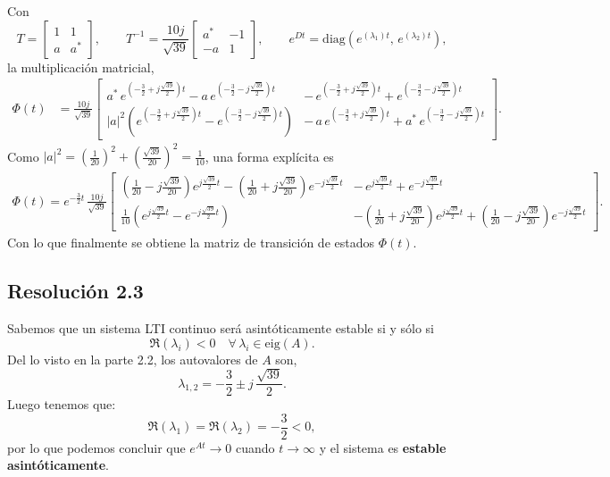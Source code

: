 \documentclass[
  11pt,
  letterpaper,
   addpoints,
   answers
  ]{exam}
\begin{document}
\begin{solution}
Con
\[
T=\begin{bmatrix}1&1\\ a&a^*\end{bmatrix},\qquad
T^{-1}=\frac{10j}{\sqrt{39}}\begin{bmatrix}a^*&-1\\ -a&1\end{bmatrix},\qquad
e^{Dt}=\mathrm{diag}\!\left(e^{(\lambda_1)t},\,e^{(\lambda_2)t}\right),
\]
la multiplicación matricial,
\begin{align}
\Phi(t)
&=\frac{10j}{\sqrt{39}}
\begin{bmatrix}
a^*\,e^{(-\frac{3}{2}+j\frac{\sqrt{39}}{2})t}-a\,e^{(-\frac{3}{2}-j\frac{\sqrt{39}}{2})t} &
-\,e^{(-\frac{3}{2}+j\frac{\sqrt{39}}{2})t}+e^{(-\frac{3}{2}-j\frac{\sqrt{39}}{2})t}
\\[6pt]
|a|^2\!\left(e^{(-\frac{3}{2}+j\frac{\sqrt{39}}{2})t}-e^{(-\frac{3}{2}-j\frac{\sqrt{39}}{2})t}\right) &
-\,a\,e^{(-\frac{3}{2}+j\frac{\sqrt{39}}{2})t}+a^*\,e^{(-\frac{3}{2}-j\frac{\sqrt{39}}{2})t}
\end{bmatrix}.
\end{align}
Como $|a|^2=\left(\frac{1}{20}\right)^2+\left(\frac{\sqrt{39}}{20}\right)^2=\frac{1}{10}$, una forma explícita es
\begin{align}
\Phi(t)=e^{-\frac{3}{2}t}\,\frac{10j}{\sqrt{39}}
\begin{bmatrix}
\left(\frac{1}{20}-j\frac{\sqrt{39}}{20}\right)e^{j\frac{\sqrt{39}}{2}t}
-\left(\frac{1}{20}+j\frac{\sqrt{39}}{20}\right)e^{-j\frac{\sqrt{39}}{2}t}
&
-\,e^{j\frac{\sqrt{39}}{2}t}+e^{-j\frac{\sqrt{39}}{2}t}
\\[8pt]
\frac{1}{10}\!\left(e^{j\frac{\sqrt{39}}{2}t}-e^{-j\frac{\sqrt{39}}{2}t}\right)
&
-\left(\frac{1}{20}+j\frac{\sqrt{39}}{20}\right)e^{j\frac{\sqrt{39}}{2}t}
+\left(\frac{1}{20}-j\frac{\sqrt{39}}{20}\right)e^{-j\frac{\sqrt{39}}{2}t}
\end{bmatrix}.
\end{align}
Con lo que finalmente se obtiene la matriz de transición de estados $\Phi(t)$.
\subsection*{Resolución 2.3}
Sabemos que un sistema LTI continuo será asintóticamente estable si y sólo si
\begin{equation}
\Re(\lambda_i)<0 \quad \forall\,\lambda_i\in\mathrm{eig}(A).
\end{equation}
Del lo visto en la parte 2.2, los autovalores de $A$ son,
\begin{equation}
\lambda_{1,2}=-\frac{3}{2}\pm j\,\frac{\sqrt{39}}{2}.
\end{equation}
Luego tenemos que:
\begin{equation}
\Re(\lambda_1)=\Re(\lambda_2)=-\frac{3}{2}<0,
\end{equation}
por lo que podemos concluir que $e^{At}\to 0$ cuando $t\to\infty$ y el sistema es \textbf{estable asintóticamente}.

\end{solution}
\end{document}

